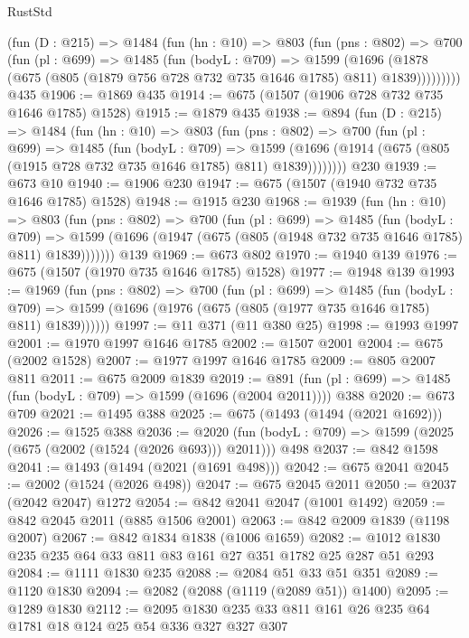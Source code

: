\begin{lexlean}{RustStd}
\begin{coremodule}
      (fun (D : @215) =>
      @1484
        (fun (hn : @10) =>
        @803
          (fun (pns : @802) =>
          @700
            (fun (pl : @699) =>
            @1485
              (fun (bodyL : @709) =>
              @1599
                (@1696
                  (@1878 (@675 (@805 (@1879 @756 @728 @732 @735 @1646 @1785) @811) @1839)))))))))
    @435
@1906 := @1869 @435
@1914 := @675 (@1507 (@1906 @728 @732 @735 @1646 @1785) @1528)
@1915 := @1879 @435
@1938 := @894
    (fun (D : @215) =>
    @1484
      (fun (hn : @10) =>
      @803
        (fun (pns : @802) =>
        @700
          (fun (pl : @699) =>
          @1485
            (fun (bodyL : @709) =>
            @1599 (@1696 (@1914 (@675 (@805 (@1915 @728 @732 @735 @1646 @1785) @811) @1839))))))))
    @230
@1939 := @673 @10
@1940 := @1906 @230
@1947 := @675 (@1507 (@1940 @732 @735 @1646 @1785) @1528)
@1948 := @1915 @230
@1968 := @1939
    (fun (hn : @10) =>
    @803
      (fun (pns : @802) =>
      @700
        (fun (pl : @699) =>
        @1485
          (fun (bodyL : @709) =>
          @1599 (@1696 (@1947 (@675 (@805 (@1948 @732 @735 @1646 @1785) @811) @1839)))))))
    @139
@1969 := @673 @802
@1970 := @1940 @139
@1976 := @675 (@1507 (@1970 @735 @1646 @1785) @1528)
@1977 := @1948 @139
@1993 := @1969
    (fun (pns : @802) =>
    @700
      (fun (pl : @699) =>
      @1485
        (fun (bodyL : @709) =>
        @1599 (@1696 (@1976 (@675 (@805 (@1977 @735 @1646 @1785) @811) @1839))))))
@1997 := @11 @371 (@11 @380 @25)
@1998 := @1993 @1997
@2001 := @1970 @1997 @1646 @1785
@2002 := @1507 @2001
@2004 := @675 (@2002 @1528)
@2007 := @1977 @1997 @1646 @1785
@2009 := @805 @2007 @811
@2011 := @675 @2009 @1839
@2019 := @891 (fun (pl : @699) => @1485 (fun (bodyL : @709) => @1599 (@1696 (@2004 @2011)))) @388
@2020 := @673 @709
@2021 := @1495 @388
@2025 := @675 (@1493 (@1494 (@2021 @1692)))
@2026 := @1525 @388
@2036 := @2020 (fun (bodyL : @709) => @1599 (@2025 (@675 (@2002 (@1524 (@2026 @693))) @2011))) @498
@2037 := @842 @1598
@2041 := @1493 (@1494 (@2021 (@1691 @498)))
@2042 := @675 @2041
@2045 := @2002 (@1524 (@2026 @498))
@2047 := @675 @2045 @2011
@2050 := @2037 (@2042 @2047) @1272
@2054 := @842 @2041 @2047 (@1001 @1492)
@2059 := @842 @2045 @2011 (@885 @1506 @2001)
@2063 := @842 @2009 @1839 (@1198 @2007)
@2067 := @842 @1834 @1838 (@1006 @1659)
@2082 := @1012 @1830 @235 @235 @64 @33 @811 @83 @161 @27 @351 @1782 @25 @287 @51 @293
@2084 := @1111 @1830 @235
@2088 := @2084 @51 @33 @51 @351
@2089 := @1120 @1830
@2094 := @2082 (@2088 (@1119 (@2089 @51)) @1400)
@2095 := @1289 @1830
@2112 := @2095 @1830 @235 @33 @811 @161 @26 @235 @64 @1781 @18 @124 @25 @54 @336 @327 @327 @307

\end{coremodule}
\end{lexlean}
